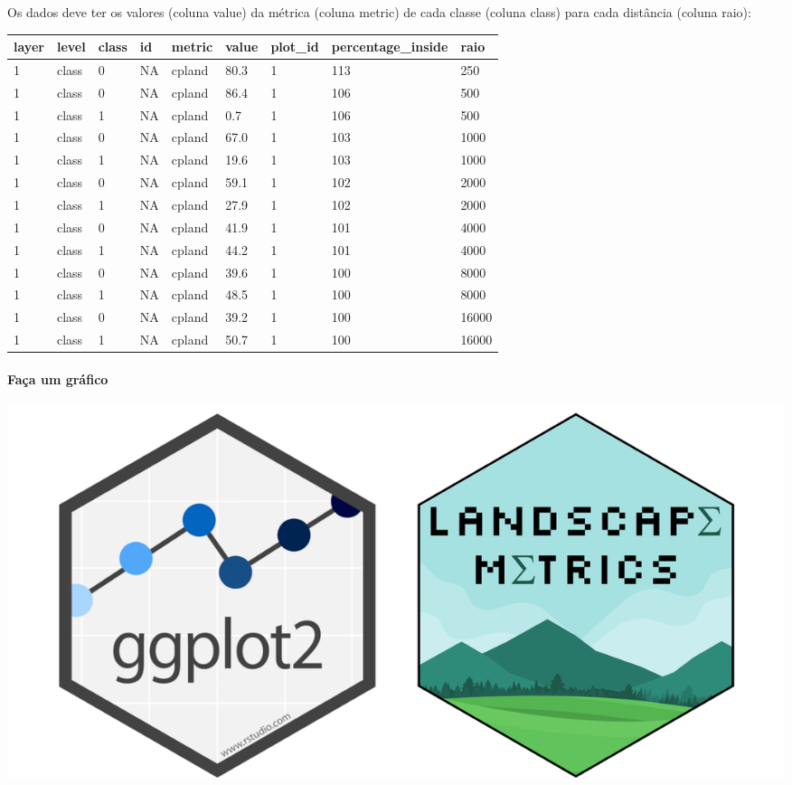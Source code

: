 \documentclass[
]{article}
\begin{document}
Os dados deve ter os valores (coluna value) da métrica (coluna metric) de cada classe (coluna class) para cada distância (coluna raio):

\begin{table}[!h]
\centering
\begin{tabular}[t]{l|l|l|l|l|l|l|l|l}
\hline
layer & level & class & id & metric & value & plot\_id & percentage\_inside & raio\\
\hline
1 & class & 0 & NA & cpland & 80.3 & 1 & 113 & 250\\
\hline
1 & class & 0 & NA & cpland & 86.4 & 1 & 106 & 500\\
\hline
1 & class & 1 & NA & cpland & 0.7 & 1 & 106 & 500\\
\hline
1 & class & 0 & NA & cpland & 67.0 & 1 & 103 & 1000\\
\hline
1 & class & 1 & NA & cpland & 19.6 & 1 & 103 & 1000\\
\hline
1 & class & 0 & NA & cpland & 59.1 & 1 & 102 & 2000\\
\hline
1 & class & 1 & NA & cpland & 27.9 & 1 & 102 & 2000\\
\hline
1 & class & 0 & NA & cpland & 41.9 & 1 & 101 & 4000\\
\hline
1 & class & 1 & NA & cpland & 44.2 & 1 & 101 & 4000\\
\hline
1 & class & 0 & NA & cpland & 39.6 & 1 & 100 & 8000\\
\hline
1 & class & 1 & NA & cpland & 48.5 & 1 & 100 & 8000\\
\hline
1 & class & 0 & NA & cpland & 39.2 & 1 & 100 & 16000\\
\hline
1 & class & 1 & NA & cpland & 50.7 & 1 & 100 & 16000\\
\hline
\end{tabular}
\end{table}

\newpage

\hypertarget{fauxe7a-um-gruxe1fico}{%
\paragraph{Faça um gráfico}\label{fauxe7a-um-gruxe1fico}}

\begin{center}\includegraphics[width=0.65\linewidth,height=0.65\textheight]{www/logo_gg_lsm} \end{center}
\end{document}
